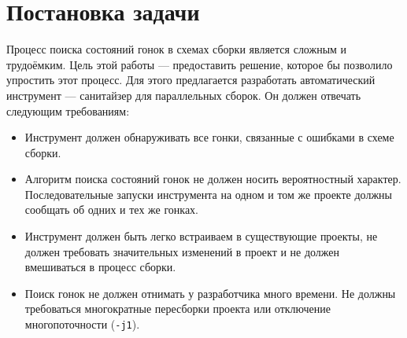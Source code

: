 \section{Постановка задачи}
\label{sec:Chapter1} 


Процесс поиска состояний гонок в схемах сборки является сложным и трудоёмким. Цель этой работы --- предоставить решение, которое бы позволило упростить этот процесс. Для этого предлагается разработать автоматический инструмент --- санитайзер для параллельных сборок. Он должен отвечать следующим требованиям:

\begin{itemize}
	\item Инструмент должен обнаруживать все гонки, связанные с ошибками в схеме сборки.
	\item Алгоритм поиска состояний гонок не должен носить вероятностный характер. Последовательные запуски инструмента на одном и том же проекте должны сообщать об одних и тех же гонках. 
	\item Инструмент должен быть легко встраиваем в существующие проекты, не должен требовать значительных изменений в проект и не должен вмешиваться в процесс сборки. 
	\item Поиск гонок не должен отнимать у разработчика много времени. Не должны требоваться многократные пересборки проекта или отключение многопоточности (\texttt{-j1}).
\end{itemize}
